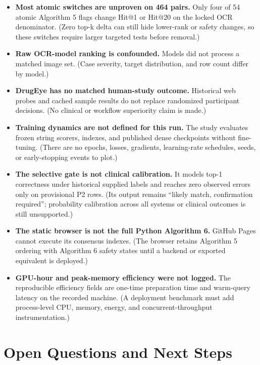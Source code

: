 \documentclass[11pt,a4paper]{article}
\begin{document}
\begin{itemize}
        improved development by 0.54 points but reduced holdout by 3.23 points.
        (No policy replaced current ordering.)
  \item \textbf{Most atomic switches are unproven on 464 pairs.} Only four of
        54 atomic Algorithm 5 flags change Hit@1 or Hit@20 on the locked OCR
        denominator. (Zero top-k delta can still hide lower-rank or safety
        changes, so these switches require larger targeted tests before removal.)
  \item \textbf{Raw OCR-model ranking is confounded.} Models did not process a
        matched image set. (Case severity, target distribution, and row count
        differ by model.)
  \item \textbf{DrugEye has no matched human-study outcome.} Historical web
        probes and cached sample results do not replace randomized participant
        decisions. (No clinical or workflow superiority claim is made.)
  \item \textbf{Training dynamics are not defined for this run.} The study
        evaluates frozen string scorers, indexes, and published dense
        checkpoints without fine-tuning. (There are no epochs, losses,
        gradients, learning-rate schedules, seeds, or early-stopping events to
        plot.)
  \item \textbf{The selective gate is not clinical calibration.} It models
        top-1 correctness under historical supplied labels and reaches zero
        observed errors only on provisional P2 rows. (Its output remains
        ``likely match, confirmation required''; probability calibration across
        all systems or clinical outcomes is still unsupported.)
  \item \textbf{The static browser is not the full Python Algorithm 6.}
        GitHub Pages cannot execute its consensus indexes. (The browser retains
        Algorithm 5 ordering with Algorithm 6 safety states until a backend or
        exported equivalent is deployed.)
  \item \textbf{GPU-hour and peak-memory efficiency were not logged.} The
        reproducible efficiency fields are one-time preparation time and
        warm-query latency on the recorded machine. (A deployment benchmark
        must add process-level CPU, memory, energy, and concurrent-throughput
        instrumentation.)
\end{itemize}

\section{Open Questions and Next Steps}
\end{document}
